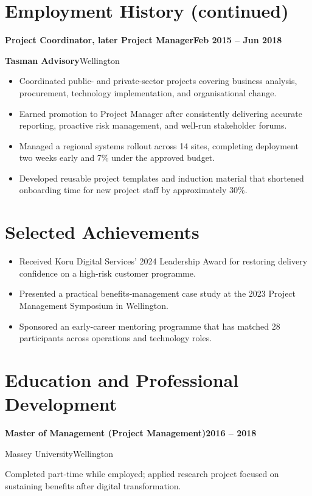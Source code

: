 \documentclass[10pt,a4paper]{article}
\newcommand{\job}[4]{%
  \textbf{#1}\hfill\textbf{#2}\par
  \textcolor{pounamu}{\textbf{#3}}\hfill\textcolor{muted}{#4}\par
}
\newcommand{\qualification}[4]{%
  \textbf{#1}\hfill\textbf{#2}\par
  \textcolor{pounamu}{#3}\hfill\textcolor{muted}{#4}\par
}
\begin{document}
\section*{Employment History (continued)}

\vspace{3pt}
\job{Project Coordinator, later Project Manager}{Feb 2015 -- Jun 2018}{Tasman Advisory}{Wellington}
\begin{itemize}
  \item Coordinated public- and private-sector projects covering business analysis, procurement, technology implementation, and organisational change.
  \item Earned promotion to Project Manager after consistently delivering accurate reporting, proactive risk management, and well-run stakeholder forums.
  \item Managed a regional systems rollout across 14 sites, completing deployment two weeks early and 7\% under the approved budget.
  \item Developed reusable project templates and induction material that shortened onboarding time for new project staff by approximately 30\%.
\end{itemize}

\section*{Selected Achievements}

\begin{itemize}
  \item Received Koru Digital Services' 2024 Leadership Award for restoring delivery confidence on a high-risk customer programme.
  \item Presented a practical benefits-management case study at the 2023 Project Management Symposium in Wellington.
  \item Sponsored an early-career mentoring programme that has matched 28 participants across operations and technology roles.
\end{itemize}

\section*{Education and Professional Development}

\qualification{Master of Management (Project Management)}{2016 -- 2018}{Massey University}{Wellington}
Completed part-time while employed; applied research project focused on sustaining benefits after digital transformation.
\end{document}
